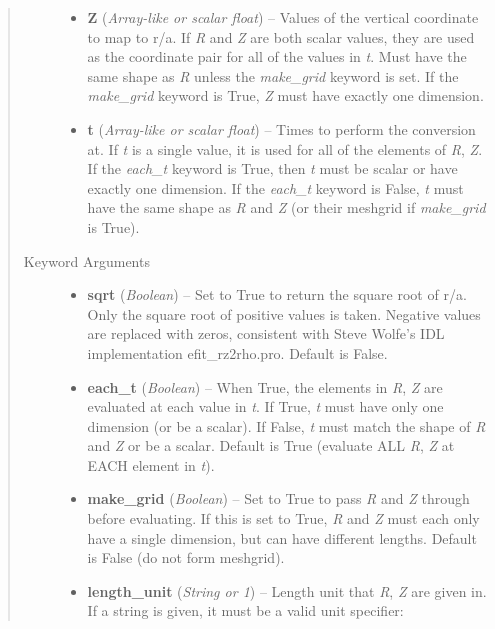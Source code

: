 \documentclass[letterpaper,10pt,english]{sphinxmanual}
\begin{document}
\begin{fulllineitems}
\begin{fulllineitems}
\begin{quote}
\begin{description}
\begin{itemize}
\item {} 
\textbf{Z} (\emph{Array-like or scalar float}) --
Values of the vertical coordinate to
map to r/a. If \emph{R} and \emph{Z} are both scalar values,
they are used as the coordinate pair for all of the values in
\emph{t}. Must have the same shape as \emph{R} unless the \emph{make\_grid}
keyword is set. If the \emph{make\_grid} keyword is True, \emph{Z} must
have exactly one dimension.

\item {} 
\textbf{t} (\emph{Array-like or scalar float}) --
Times to perform the conversion at.
If \emph{t} is a single value, it is used for all of the elements of
\emph{R}, \emph{Z}. If the \emph{each\_t} keyword is True, then \emph{t} must be
scalar or have exactly one dimension. If the \emph{each\_t} keyword is
False, \emph{t} must have the same shape as \emph{R} and \emph{Z} (or their
meshgrid if \emph{make\_grid} is True).

\end{itemize}

\item[{Keyword Arguments}] \leavevmode\begin{itemize}
\item {} 
\textbf{sqrt} (\emph{Boolean}) --
Set to True to return the square root of r/a.
Only the square root of positive values is taken. Negative
values are replaced with zeros, consistent with Steve Wolfe's
IDL implementation efit\_rz2rho.pro. Default is False.

\item {} 
\textbf{each\_t} (\emph{Boolean}) --
When True, the elements in \emph{R}, \emph{Z} are evaluated
at each value in \emph{t}. If True, \emph{t} must have only one dimension
(or be a scalar). If False, \emph{t} must match the shape of \emph{R} and
\emph{Z} or be a scalar. Default is True (evaluate ALL \emph{R}, \emph{Z} at
EACH element in \emph{t}).

\item {} 
\textbf{make\_grid} (\emph{Boolean}) --
Set to True to pass \emph{R} and \emph{Z} through
 before evaluating. If this is set to
True, \emph{R} and \emph{Z} must each only have a single dimension, but
can have different lengths. Default is False (do not form
meshgrid).

\item {} 
\textbf{length\_unit} (\emph{String or 1}) --
Length unit that \emph{R}, \emph{Z} are given in.
If a string is given, it must be a valid unit specifier:
\begin{quote}


\end{quote}
\end{itemize}
\end{description}
\end{quote}
\end{fulllineitems}
\end{fulllineitems}
\end{document}
